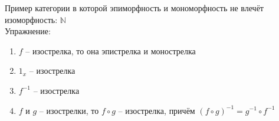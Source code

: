 Пример категории в которой эпиморфность и мономорфность не влечёт изоморфность:
$\mathbb{N}$ \\
Упражнение: \\
\begin{enumerate}
  \item $f$ -- изострелка, то она эпистрелка и монострелка \\
  \item $1_x$ -- изострелка \\
  \item $f^{-1}$ -- изострелка \\
  \item $f$ и $g$ -- изострелки, то $f \circ g$ -- изострелка, причём
        $(f \circ g)^{-1} = g^{-1} \circ f^{-1}$ \\
\end{enumerate}